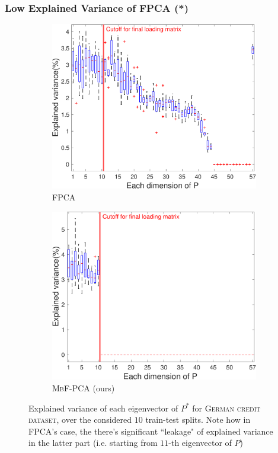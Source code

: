 \documentclass{beamer}
\begin{document}
\begin{frame}
	\frametitle{Low Explained Variance of FPCA (*)}
	\begin{figure}[!t]
		\begin{center}
			\begin{subfigure}[t]{0.49\linewidth}
				\includegraphics[width=\linewidth]{figures/supp/german_fpca.pdf}
				\caption{\label{fig:original} \textsc{FPCA} \cite{OA19}}
			\end{subfigure}\hfill
			\begin{subfigure}[t]{0.49\linewidth}
				\includegraphics[width=\linewidth]{figures/supp/german_stfpca.pdf}
				\caption{\label{fig:PCA} \textsc{MbF-PCA} (ours)}
			\end{subfigure}
			\caption{\label{fig:low-sdp} Explained variance of each eigenvector of $P^*$ for \textsc{German credit dataset}, over the considered $10$ train-test splits.
				Note how in \textsc{FPCA}'s case, the there's significant ``leakage" of explained variance in the latter part (i.e. starting from $11$-th eigenvector of $P$)}
		\end{center}
	\end{figure}
\end{frame}
\end{document}
